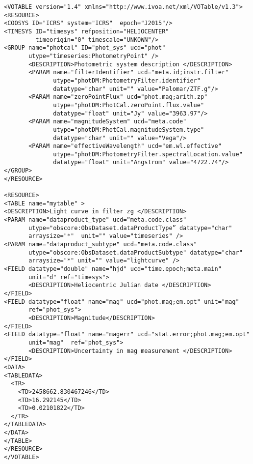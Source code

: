 \noindent
\begingroup\footnotesize
\begin{tcolorbox}
\begin{verbatim}
<VOTABLE version="1.4" xmlns="http://www.ivoa.net/xml/VOTable/v1.3">
<RESOURCE>
<COOSYS ID="ICRS" system="ICRS"  epoch="J2015"/>
<TIMESYS ID="timesys" refposition="HELIOCENTER" 
         timeorigin="0" timescale="UNKOWN"/>
<GROUP name="photcal" ID="phot_sys" ucd="phot" 
       utype="timeseries:PhotometryPoint" /> 
       <DESCRIPTION>Photometric system description </DESCRIPTION>
       <PARAM name="filterIdentifier" ucd="meta.id;instr.filter" 
              utype="photDM:PhotometryFilter.identifier" 
              datatype="char" unit="" value="Palomar/ZTF.g"/>
       <PARAM name="zeroPointFlux" ucd="phot.mag;arith.zp" 
              utype="photDM:PhotCal.zeroPoint.flux.value" 
              datatype="float" unit="Jy" value="3963.97"/>
       <PARAM name="magnitudeSystem" ucd="meta.code" 
              utype="photDM:PhotCal.magnitudeSystem.type" 
              datatype="char" unit="" value="Vega"/>
       <PARAM name="effectiveWavelength" ucd="em.wl.effective" 
              utype="photDM:PhotometryFilter.spectralLocation.value" 
              datatype="float" unit="Angstrom" value="4722.74"/>
</GROUP>
</RESOURCE>

<RESOURCE>
<TABLE name="mytable" >
<DESCRIPTION>Light curve in filter zg </DESCRIPTION>
<PARAM name="dataproduct_type" ucd=“meta.code.class" 
       utype="obscore:ObsDataset.dataProductType” datatype="char" 
       arraysize="*"  unit="" value="timeseries" />
<PARAM name="dataproduct_subtype" ucd="meta.code.class" 
       utype="obscore:ObsDataset.dataProductSubtype" datatype="char" 
       arraysize="*" unit="" value="lightcurve" />
<FIELD datatype="double" name="hjd" ucd="time.epoch;meta.main" 
       unit="d" ref="timesys">
       <DESCRIPTION>Heliocentric Julian date </DESCRIPTION>
</FIELD>
<FIELD datatype="float" name="mag" ucd="phot.mag;em.opt" unit="mag" 
       ref="phot_sys">
       <DESCRIPTION>Magnitude</DESCRIPTION>
</FIELD>
<FIELD datatype="float" name="magerr" ucd="stat.error;phot.mag;em.opt" 
       unit="mag"  ref="phot_sys">
       <DESCRIPTION>Uncertainty in mag measurement </DESCRIPTION>
</FIELD>
<DATA>  
<TABLEDATA>
  <TR>
    <TD>2458662.830467246</TD>
    <TD>16.292145</TD>
    <TD>0.02101822</TD>
  </TR>
</TABLEDATA>
</DATA>
</TABLE>
</RESOURCE>
</VOTABLE>
\end{verbatim}
\end{tcolorbox}
\endgroup
